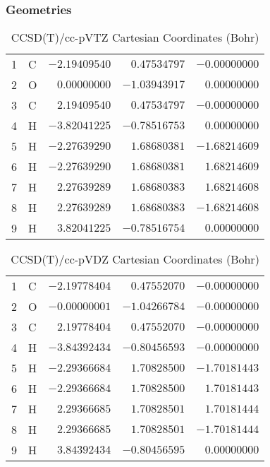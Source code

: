 \documentclass[10pt,oneside]{article}
\begin{document}
\clearpage

\subsection{\ \ \ }

\subsubsection*{Geometries}
\begin{table}[h!]
\centering
\caption{CCSD(T)/cc-pVTZ Cartesian Coordinates (Bohr)}
\begin{tabular}{llrrr}
1  & C  & $-2.19409540$ & $ 0.47534797$ & $-0.00000000$ \\
2  & O  & $ 0.00000000$ & $-1.03943917$ & $ 0.00000000$ \\
3  & C  & $ 2.19409540$ & $ 0.47534797$ & $-0.00000000$ \\
4  & H  & $-3.82041225$ & $-0.78516753$ & $ 0.00000000$ \\
5  & H  & $-2.27639290$ & $ 1.68680381$ & $-1.68214609$ \\
6  & H  & $-2.27639290$ & $ 1.68680381$ & $ 1.68214609$ \\
7  & H  & $ 2.27639289$ & $ 1.68680383$ & $ 1.68214608$ \\
8  & H  & $ 2.27639289$ & $ 1.68680383$ & $-1.68214608$ \\
9  & H  & $ 3.82041225$ & $-0.78516754$ & $ 0.00000000$ \\
\end{tabular}
\end{table}

\begin{table}[h!]
\centering
\caption{CCSD(T)/cc-pVDZ Cartesian Coordinates (Bohr)}
\begin{tabular}{llrrr}
1  & C  & $-2.19778404$ & $ 0.47552070$ & $-0.00000000$ \\
2  & O  & $-0.00000001$ & $-1.04266784$ & $-0.00000000$ \\
3  & C  & $ 2.19778404$ & $ 0.47552070$ & $-0.00000000$ \\
4  & H  & $-3.84392434$ & $-0.80456593$ & $-0.00000000$ \\
5  & H  & $-2.29366684$ & $ 1.70828500$ & $-1.70181443$ \\
6  & H  & $-2.29366684$ & $ 1.70828500$ & $ 1.70181443$ \\
7  & H  & $ 2.29366685$ & $ 1.70828501$ & $ 1.70181444$ \\
8  & H  & $ 2.29366685$ & $ 1.70828501$ & $-1.70181444$ \\
9  & H  & $ 3.84392434$ & $-0.80456595$ & $ 0.00000000$ \\
\end{tabular}
\end{table}
\end{document}
